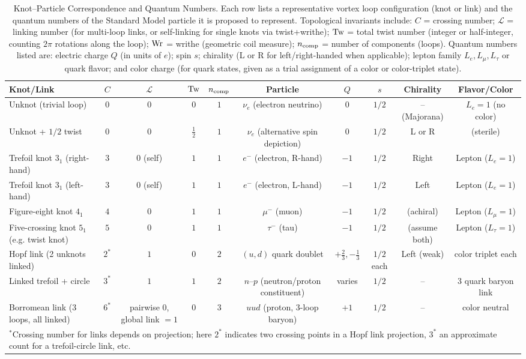 \documentclass[12pt]{article}
\begin{document}
\begin{table}[h]\small\centering
\caption{Knot–Particle Correspondence and Quantum Numbers. Each row lists a representative vortex loop configuration (knot or link) and the quantum numbers of the Standard Model particle it is proposed to represent. Topological invariants include: $C$ = crossing number; $\mathcal{L}$ = linking number (for multi-loop links, or self-linking for single knots via twist+writhe); ${\rm Tw}$ = total twist number (integer or half-integer, counting $2\pi$ rotations along the loop); ${\rm Wr}$ = writhe (geometric coil measure); $n_{\rm comp}$ = number of components (loops). Quantum numbers listed are: electric charge $Q$ (in units of $e$); spin $s$; chirality (L or R for left/right-handed when applicable); lepton family $L_e, L_\mu, L_\tau$ or quark flavor; and color charge (for quark states, given as a trial assignment of a color or color-triplet state).}
\begin{tabular}{ l | c c c c | c c c c c }
\hline\hline
\textbf{Knot/Link} & $C$ & $\mathcal{L}$ & ${\rm Tw}$ & $n_{\rm comp}$ & \textbf{Particle} & $Q$ & $s$ & \textbf{Chirality} & \textbf{Flavor/Color} \\
\hline
Unknot (trivial loop) & $0$ & $0$ & $0$ & $1$ & $\nu_e$ (electron neutrino) & $0$ & $1/2$ & -- (Majorana) & $L_e=1$ (no color) \\
Unknot + $1/2$ twist & $0$ & $0$ & $\tfrac{1}{2}$ & $1$ & $\nu_e$ (alternative spin depiction) & $0$ & $1/2$ & L or R & (sterile) \\
Trefoil knot $3_1$ (right-hand) & $3$ & $0$ (self) & $1$ & $1$ & $e^-$ (electron, R-hand) & $-1$ & $1/2$ & Right & Lepton ($L_e=1$) \\
Trefoil knot $3_1$ (left-hand) & $3$ & $0$ (self) & $1$ & $1$ & $e^-$ (electron, L-hand) & $-1$ & $1/2$ & Left & Lepton ($L_e=1$) \\
Figure-eight knot $4_1$ & $4$ & $0$ & $1$ & $1$ & $\mu^-$ (muon) & $-1$ & $1/2$ & (achiral) & Lepton ($L_\mu=1$) \\
Five-crossing knot $5_1$ (e.g. twist knot) & $5$ & $0$ & $1$ & $1$ & $\tau^-$ (tau) & $-1$ & $1/2$ & (assume both) & Lepton ($L_\tau=1$) \\
Hopf link (2 unknots linked) & $2^*$ & $1$ & $0$ & $2$ & $(u,d)$ quark doublet & $+\tfrac{2}{3}, -\tfrac{1}{3}$ & $1/2$ each & Left (weak) & color triplet each \\
Linked trefoil + circle & $3^*$ & $1$ & $1$ & $2$ & $n$–$p$ (neutron/proton constituent) & varies & $1/2$ & -- & 3 quark baryon link \\
Borromean link (3 loops, all linked) & $6^*$ & pairwise $0$, global link $=1$ & $0$ & $3$ & $uud$ (proton, 3-loop baryon) & $+1$ & $1/2$ & -- & color neutral \\
\hline\hline
\multicolumn{10}{l}{\footnotesize $^*$Crossing number for links depends on projection; here $2^*$ indicates two crossing points in a Hopf link projection, $3^*$ an approximate count for a trefoil-circle link, etc.}
\end{tabular}
\end{table}
\end{document}
